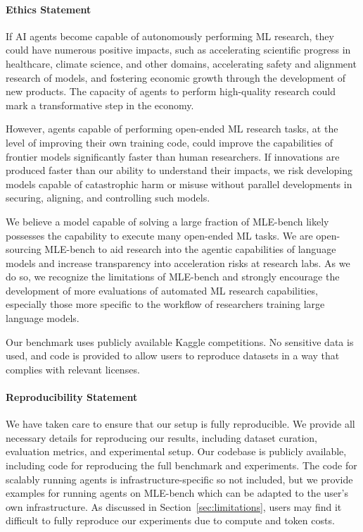 \documentclass{article} %
\begin{document}
\paragraph{Ethics Statement}

If AI agents become capable of autonomously performing ML research, they could have numerous positive impacts, such as accelerating scientific progress in healthcare, climate science, and other domains, accelerating safety and alignment research of models, and fostering economic growth through the development of new products. The capacity of agents to perform high-quality research could mark a transformative step in the economy.

However, agents capable of performing open-ended ML research tasks, at the level of improving their own training code, could improve the capabilities of frontier models significantly faster than human researchers. If innovations are produced faster than our ability to understand their impacts, we risk developing models capable of catastrophic harm or misuse without parallel developments in securing, aligning, and controlling such models.

We believe a model capable of solving a large fraction of MLE-bench likely possesses the capability to execute many open-ended ML tasks. We are open-sourcing MLE-bench to aid research into the agentic capabilities of language models and increase transparency into acceleration risks at research labs. As we do so, we recognize the limitations of MLE-bench and strongly encourage the development of more evaluations of automated ML research capabilities, especially those more specific to the workflow of researchers training large language models.

Our benchmark uses publicly available Kaggle competitions. No sensitive data is used, and code is provided to allow users to reproduce datasets in a way that complies with relevant licenses. 

\paragraph{Reproducibility Statement} We have taken care to ensure that our setup is fully reproducible. We provide all necessary details for reproducing our results, including dataset curation, evaluation metrics, and experimental setup. Our codebase is publicly available, including code for reproducing the full benchmark and experiments. The code for scalably running agents is infrastructure-specific so not included, but we provide examples for running agents on MLE-bench which can be adapted to the user's own infrastructure. As discussed in Section~\ref{sec:limitations}, users may find it difficult to fully reproduce our experiments due to compute and token costs.
\end{document}
